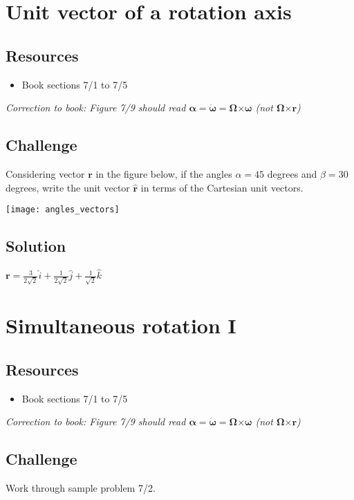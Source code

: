 \newpage
\section{Unit vector of a rotation axis}

\subsection*{Resources}
\begin{itemize}
    \item Book sections 7/1 to 7/5
\end{itemize}

\emph{Correction to book: Figure 7/9 should read $\bm{\alpha} = \bm{\dot{\omega}} = \bm{\Omega} \bm{\times} \bm{\omega}$ (not $\bm{\Omega} \bm{\times} \bm{r}$)}

\subsection*{Challenge}
Considering vector $\bm{r}$ in the figure below, if the angles $\alpha = 45$ degrees and $\beta = 30$ degrees, write the unit vector $\bm{\hat{r}}$ in terms of the Cartesian unit vectors.

\texttt{[image: angles\_vectors]}

\subsection*{Solution}
$\bm{r} = \frac{3}{2\sqrt{2}} \hat{i} + \frac{1}{2\sqrt{2}} \hat{j} + \frac{1}{\sqrt{2}} \hat{k}$


\newpage
\section{Simultaneous rotation I}

\subsection*{Resources}
\begin{itemize}
    \item Book sections 7/1 to 7/5
\end{itemize}

\emph{Correction to book: Figure 7/9 should read $\bm{\alpha} = \bm{\dot{\omega}} = \bm{\Omega} \bm{\times} \bm{\omega}$ (not $\bm{\Omega} \bm{\times} \bm{r}$)}

\subsection*{Challenge}
Work through sample problem 7/2.




